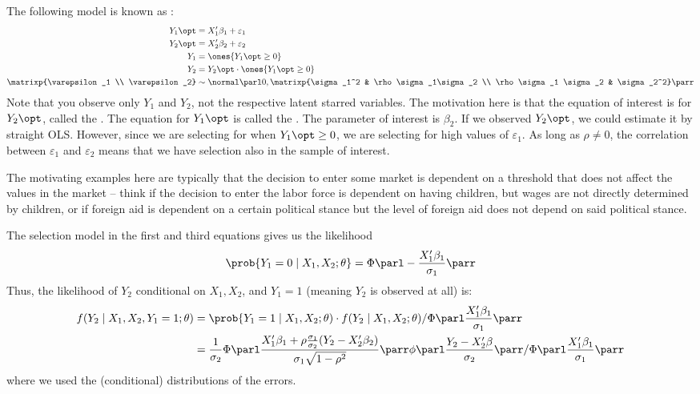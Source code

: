 \documentclass[10pt]{article}
\begin{document}
\begin{example}
	 The following model is known as : \begin{align*} Y_1\opt &= X_1'\beta_1 + \varepsilon_1 \\ Y_2\opt &= X_2'\beta_2 + \varepsilon_2 \\ Y_1 &= \ones\{Y_1\opt \ge 0\} \\ Y_2 &= Y_2\opt \cdot \ones\{Y_1\opt \ge 0\} \\ \matrixp{\varepsilon_1 \\ \varepsilon_2} &\sim \normal\parl 0, \matrixp{\sigma_1^2 & \rho\sigma_1\sigma_2 \\ \rho \sigma_1 \sigma_2 & \sigma_2^2}\parr\end{align*}
	Note that you observe only $Y_1$ and $Y_2$, not the respective latent starred variables. The motivation here is that the  equation of interest is for $Y_2\opt$, called the . The equation for $Y_1\opt$ is called the . The parameter of interest is $\beta_2$. If we observed $Y_2\opt$, we could estimate it by straight OLS. However, since we are selecting for when $Y_1\opt \ge 0$, we are selecting for high values of $\varepsilon_1$. As long as $\rho \ne 0$, the correlation between $\varepsilon_1$ and $\varepsilon_2$ means that we have selection also in the sample of interest.
	
	The motivating examples here are typically that the decision to enter some market is dependent on a threshold that does not affect the values in the market -- think if the decision to enter the labor force is dependent on having children, but wages are not directly determined by children, or if foreign aid is dependent on a certain political stance but the level of foreign aid does not depend on said political stance.
	
	The selection model in the first and third equations gives us the likelihood\[\prob\{Y_1 = 0 \mid X_1,X_2;\theta\} = \Phi\parl - \frac{X_1'\beta_1}{\sigma_1}\parr\]Thus, the likelihood of $Y_2$ conditional on $X_1,X_2$, and $Y_1 = 1$ (meaning $Y_2$ is observed at all) is:
	\begin{align*}
		f(Y_2 \mid X_1,X_2,Y_1=1;\theta) &= \prob\{Y_1 = 1\mid X_1,X_2;\theta) \cdot f(Y_2 \mid X_1,X_2 ; \theta) / \Phi\parl \frac{X_1'\beta_1}{\sigma_1}\parr \\&= \frac{1}{\sigma_2} \Phi \parl \frac{X_1'\beta_1 + \rho \frac{\sigma_1}{\sigma_2} (Y_2 - X_2'\beta_2)}{\sigma_1 \sqrt{1-\rho^2}}\parr \phi \parl \frac{Y_2 - X_2'\beta}{\sigma_2}\parr / \Phi \parl \frac{X_1'\beta_1}{\sigma_1}\parr
	\end{align*}
	where we used the (conditional) distributions of the errors.
	

\end{example}
\end{document}
